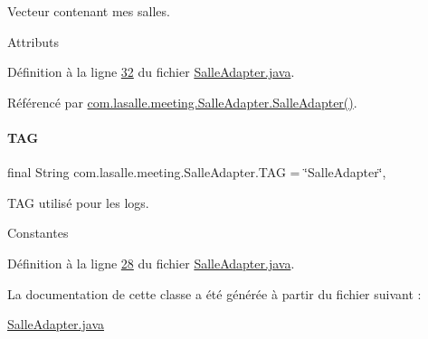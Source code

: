Vecteur contenant mes salles. 

Attributs 

Définition à la ligne \hyperlink{_salle_adapter_8java_source_l00032}{32} du fichier \hyperlink{_salle_adapter_8java_source}{Salle\+Adapter.\+java}.



Référencé par \hyperlink{_salle_adapter_8java_source_l00038}{com.\+lasalle.\+meeting.\+Salle\+Adapter.\+Salle\+Adapter()}.

\mbox{\label{classcom_1_1lasalle_1_1meeting_1_1_salle_adapter_a774947591a1beedaffd58989783206b1}} 
\paragraph{\texorpdfstring{T\+AG}{TAG}}
{\footnotesize\ttfamily final String com.\+lasalle.\+meeting.\+Salle\+Adapter.\+T\+AG = \char`\"{}Salle\+Adapter\char`\"{}\hspace{0.3cm}{\ttfamily [static]}, {\ttfamily [private]}}



T\+AG utilisé pour les logs. 

Constantes 

Définition à la ligne \hyperlink{_salle_adapter_8java_source_l00028}{28} du fichier \hyperlink{_salle_adapter_8java_source}{Salle\+Adapter.\+java}.



La documentation de cette classe a été générée à partir du fichier suivant \+:\begin{DoxyCompactItemize}
\item 
\hyperlink{_salle_adapter_8java}{Salle\+Adapter.\+java}\end{DoxyCompactItemize}
